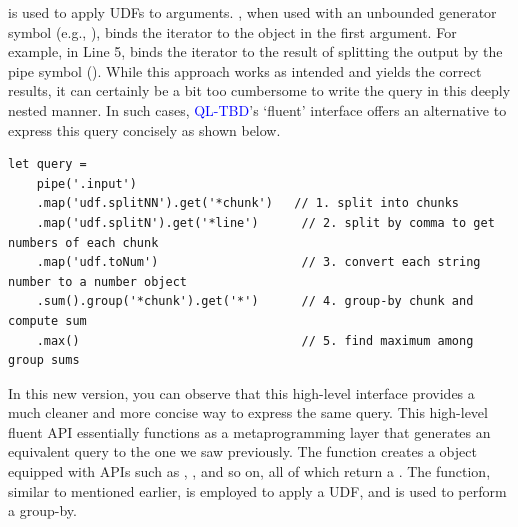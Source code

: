 \documentclass[runningheads]{llncs}
\newcommand{\lang}{\textcolor{blue}{QL-TBD}}
\begin{document}
 is used to apply UDFs to arguments.
, when used with an unbounded generator symbol (e.g., ), binds the
iterator to the object in the first argument.
For example, in Line 5,  binds the iterator
 to the result of splitting the output by the pipe symbol (\inline{|}).
While this approach works as intended and yields the correct results, it can certainly be
a bit too cumbersome to write the query in this deeply nested manner.
In such cases, \lang{}'s `fluent' interface offers an alternative to express
this query concisely as shown below.


\begin{lstlisting}[style=JavaScript, columns=flexible]
let query =
    pipe('.input')
    .map('udf.splitNN').get('*chunk')   // 1. split into chunks
    .map('udf.splitN').get('*line')      // 2. split by comma to get numbers of each chunk
    .map('udf.toNum')                    // 3. convert each string number to a number object
    .sum().group('*chunk').get('*')      // 4. group-by chunk and compute sum
    .max()                               // 5. find maximum among group sums
\end{lstlisting}

In this new version, you can observe that this high-level interface provides a
much cleaner and more concise way to express the same query. 
This high-level fluent API essentially functions as a metaprogramming layer
that generates an equivalent query to the one we saw previously.
The  function creates a  object equipped with
APIs such as , , and so on, all of which return a
.
The  function, similar to  mentioned earlier,
is employed to apply a UDF, and  is used to perform a group-by.


\end{document}
